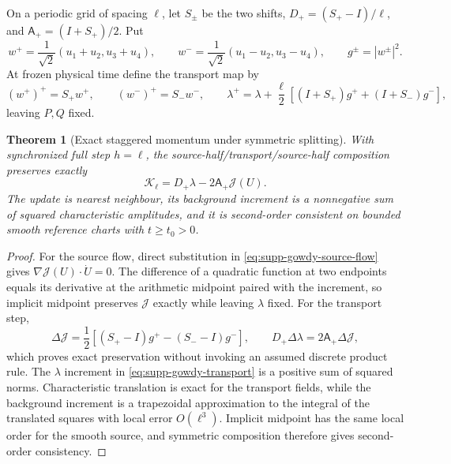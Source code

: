 \documentclass[11pt]{article}
\newtheorem{theorem}{Theorem}[section]
\theoremstyle{definition}
\theoremstyle{remark}
\begin{document}
On a periodic grid of spacing $\ell$, let $S_\pm$ be the two shifts,
$D_+=(S_+-I)/\ell$, and $\mathsf A_+=(I+S_+)/2$.  Put
\begin{equation}
 w^+=\frac1{\sqrt2}(u_1+u_2,u_3+u_4),\qquad
 w^-=\frac1{\sqrt2}(u_1-u_2,u_3-u_4),\qquad
 g^\pm=|w^\pm|^2.
 \label{eq:supp-gowdy-characteristics}
\end{equation}
At frozen physical time define the transport map by
\begin{equation}
 (w^+)^+=S_+w^+,
 \qquad (w^-)^+=S_-w^-,
 \qquad
 \lambda^+=\lambda+\frac\ell2
 [(I+S_+)g^++(I+S_-)g^-],
 \label{eq:supp-gowdy-transport}
\end{equation}
leaving $P,Q$ fixed.

\begin{theorem}[Exact staggered momentum under symmetric splitting]
\label{thm:supp-gowdy-momentum}
With synchronized full step $h=\ell$, the source-half/transport/source-half
composition preserves exactly
\begin{equation}
 \boxed{\mathcal K_\ell
 =D_+\lambda-2\mathsf A_+\mathcal J(U).}
 \label{eq:supp-gowdy-staggered-momentum}
\end{equation}
The update is nearest neighbour, its background increment is a nonnegative sum
of squared characteristic amplitudes, and it is second-order consistent on
bounded smooth reference charts with $t\ge t_0>0$.
\end{theorem}

\begin{proof}
For the source flow, direct substitution in
\eqref{eq:supp-gowdy-source-flow} gives
$\nabla\mathcal J(U)\cdot\dot U=0$.  The difference of a quadratic function at
two endpoints equals its derivative at the arithmetic midpoint paired with the
increment, so implicit midpoint preserves $\mathcal J$ exactly while leaving
$\lambda$ fixed.  For the transport step,
\begin{equation}
 \Delta\mathcal J
 =\frac12[(S_+-I)g^+-(S_--I)g^-],\qquad
 D_+\Delta\lambda=2\mathsf A_+\Delta\mathcal J,
 \label{eq:supp-gowdy-transport-identity}
\end{equation}
which proves exact preservation without invoking an assumed discrete product
rule.  The $\lambda$ increment in \eqref{eq:supp-gowdy-transport} is a positive
sum of squared norms.  Characteristic translation is exact for the transport
fields, while the background increment is a trapezoidal approximation to the
integral of the translated squares with local error $O(\ell^3)$.  Implicit
midpoint has the same local order for the smooth source, and symmetric
composition therefore gives second-order consistency.
\end{proof}
\end{document}

